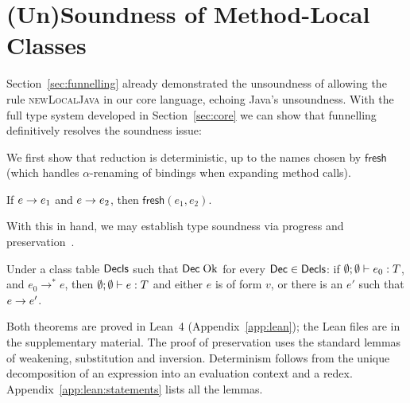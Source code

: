 \section{(Un)Soundness of Method-Local Classes}
\label{sec:soundness}
Section~\ref{sec:funnelling} already demonstrated the unsoundness of allowing the rule \textsc{newLocalJava} in our core language,
echoing Java's unsoundness.
With the full type system developed in Section~\ref{sec:core} we can show that funnelling definitively resolves the soundness issue:


We first show that reduction is deterministic, up to the names chosen by $\mathsf{fresh}$ (which handles $\alpha$-renaming of bindings when expanding method calls).

\begin{theorem}[Determinism]
If $e\rightarrow e_1$ and $e\rightarrow e_2$, then $\mathsf{fresh}(e_1,e_2)$.
\end{theorem}

With this in hand, we may establish type soundness via progress and preservation~\cite{wright1994syntactic}.

\begin{theorem}
Under a class table $\mathsf{Decls}$ such that $\mathsf{Dec}\mskip5mu\mathrm{Ok}$ for every $\mathsf{Dec}\in\mathsf{Decls}$:
if $\emptyset;\emptyset\vdash e_0 : T$, and $e_0\rightarrow^* e$, then $\emptyset;\emptyset\vdash e : T$ and either $e$ is of form $v$, or there is an $e'$ such that $e\rightarrow e'$.
\end{theorem}

Both theorems are proved in Lean~4 (Appendix~\ref{app:lean}); the Lean files are in the supplementary material.
The proof of preservation uses the standard lemmas of weakening, substitution and inversion.
Determinism follows from the unique decomposition of an expression into an evaluation context and a redex.
Appendix~\ref{app:lean:statements} lists all the lemmas.

